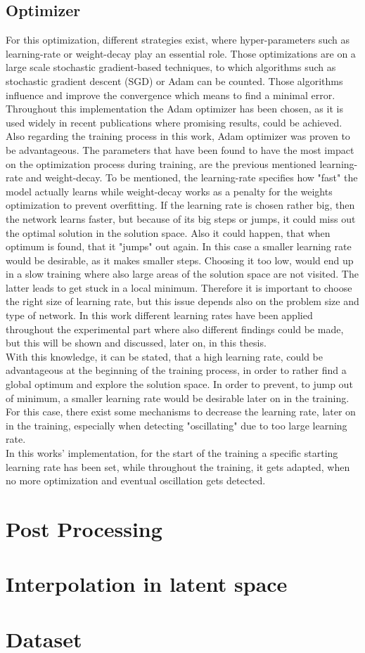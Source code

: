\subsection{Optimizer}
For this optimization, different strategies exist, where hyper-parameters such as learning-rate or weight-decay play an essential role. Those optimizations are on a large scale stochastic gradient-based techniques, to which algorithms such as stochastic gradient descent (SGD) or Adam can be counted. Those algorithms influence and improve the convergence which means to find a minimal error. Throughout this implementation the Adam optimizer \cite{Kingma2014} has been chosen, as it is used widely in recent publications where promising results, could be achieved. Also regarding the training process in this work, Adam optimizer was proven to be advantageous. The parameters that have been found to have the most impact on the optimization process during training, are the previous mentioned learning-rate and weight-decay. To be mentioned, the learning-rate specifies how "fast" the model actually learns while weight-decay works as a penalty for the weights optimization to prevent overfitting. If the learning rate is chosen rather big, then the network learns faster, but because of its big steps or jumps, it could miss out the optimal solution in the solution space. Also it could happen, that when optimum is found, that it "jumps" out again. In this case a smaller learning rate would be desirable, as it makes smaller steps. Choosing it too low, would end up in a slow training where also large areas of the solution space are not visited. The latter leads to get stuck in a local minimum. Therefore it is important to choose the right size of learning rate, but this issue depends also on the problem size and type of network. In this work different learning rates have been applied throughout the experimental part where also different findings could be made, but this will be shown and discussed, later on, in this thesis.\\
With this knowledge, it can be stated, that a high learning rate, could be advantageous at the beginning of the training process, in order to rather find a global optimum and explore the solution space. In order to prevent, to jump out of minimum, a smaller learning rate would be desirable later on in the training. For this case, there exist some mechanisms to decrease the learning rate, later on in the training, especially when detecting "oscillating" due to too large learning rate.\\
In this works' implementation, for the start of the training a specific starting learning rate has been set, while throughout the training, it gets adapted, when no more optimization and eventual oscillation gets detected. 





\section{Post Processing}
\label{sec:app_post_processing}

\section{Interpolation in latent space}
\label{sec:app_interpolation}

\section{Dataset}
\label{sec:app_dataset}